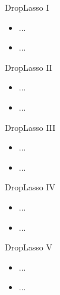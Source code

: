 \documentclass{beamer}
\begin{document}
\begin{frame}{DropLasso I}

\begin{itemize}
  \itemsep10pt
  \item ...
  \item ...
\end{itemize}

\end{frame}


\begin{frame}{DropLasso II}

\begin{itemize}
  \itemsep10pt
  \item ...
  \item ...
\end{itemize}

\end{frame}


\begin{frame}{DropLasso III}

\begin{itemize}
  \itemsep10pt
  \item ...
  \item ...
\end{itemize}

\end{frame}


\begin{frame}{DropLasso IV}

\begin{itemize}
  \itemsep10pt
  \item ...
  \item ...
\end{itemize}

\end{frame}


\begin{frame}{DropLasso V}

\begin{itemize}
  \itemsep10pt
  \item ...
  \item ...
\end{itemize}

\end{frame}
\end{document}
